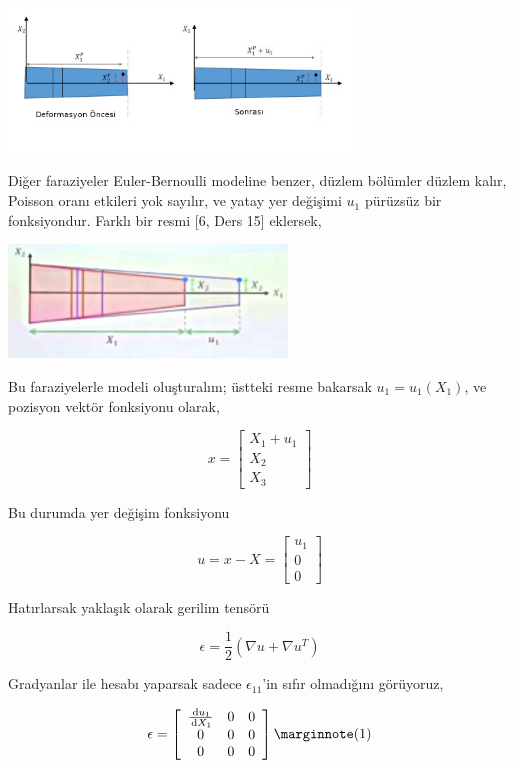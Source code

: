 \documentclass[12pt,fleqn]{article}\usepackage{../../common}
\begin{document}
\includegraphics[width=25em]{phy_020_strs_04_06.jpg}

Diğer faraziyeler Euler-Bernoulli modeline benzer, düzlem bölümler düzlem kalır,
Poisson oranı etkileri yok sayılır, ve yatay yer değişimi $u_1$ pürüzsüz bir
fonksiyondur. Farklı bir resmi [6, Ders 15] eklersek,

\includegraphics[width=20em]{phy_020_strs_04_08.jpg}

Bu faraziyelerle modeli oluşturalım; üstteki resme bakarsak $u_1 = u_1(X_1)$, ve
pozisyon vektör fonksiyonu olarak,

$$
x = \left[\begin{array}{c}
X_1 + u_1 \\ X_2 \\ X_3
\end{array}\right]
$$

Bu durumda yer değişim fonksiyonu

$$
u = x - X = \left[\begin{array}{c}
u_1 \\ 0 \\ 0
\end{array}\right]
$$

Hatırlarsak yaklaşık olarak gerilim tensörü

$$
\epsilon = \frac{1}{2} (\nabla u + \nabla u^T )
$$

Gradyanlar ile hesabı yaparsak sadece $\epsilon_{11}$'in sıfır olmadığını
görüyoruz,

$$
\epsilon = \left[\begin{array}{ccc}
\frac{\ud u_1}{\ud X_1} & 0 & 0 \\
0 & 0 & 0 \\
0 & 0 & 0 
\end{array}\right]
\mlabel{1}
$$
\end{document}
